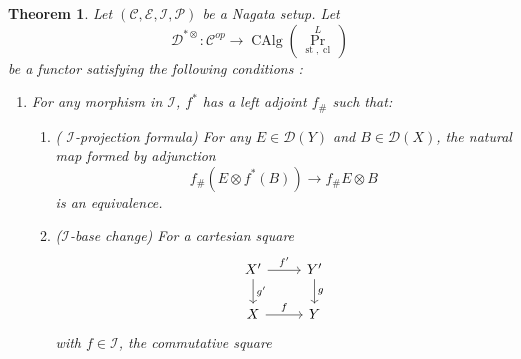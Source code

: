 \documentclass[14pt]{article}
\newtheorem{theorem}{Theorem}[subsection]
\theoremstyle{definition}
\newcommand{\E}{\mathcal{E}}
\newcommand{\D}{\mathcal{D}}
\renewcommand{\P}{\mathcal{P}}
\newcommand{\op}[1]{\operatorname{#1}}
\newcommand{\I}{\mathscr{I}}
\newcommand{\Ca}{\mathcal{C}}
\numberwithin{subsection}{section}
\begin{document}
\begin{theorem}\cite[Theorem 5.2.5]{chowdhury2025sixfunctorformalismsiiiconstruction}\label{theorem: mainconstructiontheorem}
Let $(\Ca,\E,\I,\P)$ be a Nagata setup. Let
\begin{equation}
   \D^{*\otimes}: \Ca^{op} \to \op{CAlg}(\op{Pr}^L_{\op{st},\op{cl}})
\end{equation}
be a functor satisfying the following conditions : 
		\begin{enumerate}
			\item  For any  morphism in $\I$, $f^*$ has a left adjoint $f_{\#}$ such that: 
			\begin{enumerate}
				\item  ( $\I$-projection formula) For  any $E \in \D(Y)$ and $B \in \D(X)$, the natural map formed by adjunction
				\begin{equation}\label{smothpro}
					f_{\#}(E \otimes f^*(B)) \to f_{\#}E \otimes B \end{equation} is an equivalence.
				\item  ($\I$-base change) For a cartesian square
				\begin{equation}\label{8.1}
					\begin{tikzcd}
						X' \arrow[r,"f'"] \arrow[d,"g'"] & Y' \arrow[d,"g"] \\
						X \arrow[r,"f"] & Y
					\end{tikzcd}
				\end{equation}
				with $f \in \I$, the commutative square  
				

\end{enumerate}
\end{enumerate}
\end{theorem}
\end{document}
